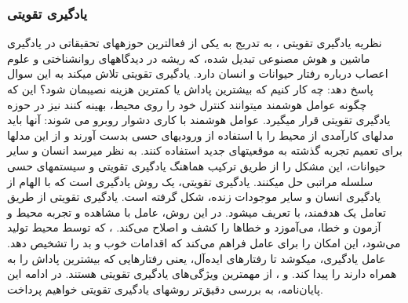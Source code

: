 \subsubsection{یادگیری تقویتی}
نظریه یادگیری تقویتی 
،
به تدریج به یکی از فعال\nf ترین حوزه\nf های تحقیقاتی در یادگیری ماشین و هوش مصنوعی تبدیل شده، که ریشه در دیدگاه\nf های روانشناختی و علوم اعصاب درباره رفتار حیوانات و انسان دارد. یادگیری تقویتی تلاش می\nf کند به این سوال پاسخ دهد: چه کار کنیم که بیش\nf ترین پاداش یا کم\nf ترین هزینه نصیبمان شود؟ این که چگونه عوامل هوشمند می\nf توانند کنترل خود را روی محیط، بهینه کنند نیز در حوزه یادگیری تقویتی قرار می\nf گیرد. عوامل هوشمند با کاری دشوار روبرو می شوند: آنها باید مدل\nf های کارآمدی از محیط را با استفاده از ورودی\nf های حسی بدست آورند و از این مدل\nf ها برای تعمیم تجربه گذشته به موقعیت\nf های جدید استفاده کنند. به نظر می\nf رسد انسان و سایر حیوانات، این مشکل را از طریق ترکیب هماهنگ یادگیری تقویتی و سیستم\nf های حسی سلسله مراتبی حل می\nf کنند.
یادگیری تقویتی، یک روش یادگیری است که با الهام از یادگیری انسان و سایر موجودات زنده، شکل گرفته است. یادگیری تقویتی از طریق تعامل یک 
\textit{
}
هدفمند،
 با 
\textit{}
تعریف می\nf شود.  در این روش، عامل با مشاهده و تجربه محیط و آزمون و خطا، می‌‌آموزد و خطاها را کشف و اصلاح می‌کند.  
\textit{}
،
که توسط محیط تولید می‌شود، این امکان را برای عامل فراهم می‌کند که اقدامات خوب و بد را تشخیص دهد.  عامل یادگیری، می\nf کوشد تا رفتارهای ایده‌آل، یعنی رفتارهایی که بیشترین پاداش را به همراه دارند را  پیدا کند.  و ، از مهم\nf ترین ویژگی‌های یادگیری تقویتی هستند. در ادامه این پایان‌نامه، به بررسی دقیق‌تر روش\nf های یادگیری تقویتی خواهیم پرداخت.


